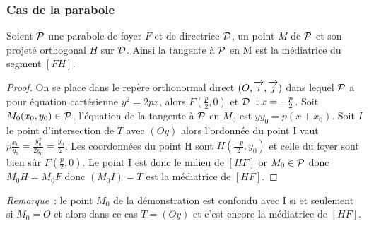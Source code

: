 \subsubsection{Cas de la parabole}
\begin{prop}
  Soient \(\P\) une parabole de foyer \(F\) et de directrice \(\Dr\), un point \(M\) de \(\P\) et son projeté orthogonal \(H\) sur \(\Dr\). Ainsi la tangente à \(\P\) en M est la médiatrice du segment \([FH]\).
\end{prop}
\begin{proof}
  On se place dans le repère orthonormal direct \(\rond\) dans lequel \(\P\) a pour équation cartésienne \(y^2=2px\), alors \(F\left(\frac{p}{2},0\right)\) et \(\Dr{}~: x=-\frac{p}{2}\). Soit \(M_0(x_0,y_0)\in\P\), l'équation de la tangente à \(\P\) en \(M_0\) est \(yy_0=p(x+x_0)\). Soit \(I\) le point d'intersection de \(T\) avec \((Oy)\) alors l'ordonnée du point I vaut \(p\frac{x_0}{y_0}=\frac{y_0^2}{2y_0}=\frac{y_0}{2}\). Les coordonnées du point H sont \(H\left(\frac{-p}{2}, y_0\right)\) et celle du foyer sont bien sûr \(F\left(\frac{p}{2},0\right)\). Le point I est donc le milieu de \([HF]\) or \(M_0\in\P\) donc \(M_0H=M_0F\) donc \((M_0I)=T\) est la médiatrice de \([HF]\).
\end{proof}
\emph{Remarque}~: le point \(M_0\) de la démonstration est confondu avec I si et seulement si \(M_0=O\) et alors dans ce cas \(T=(Oy)\) et c'est encore la médiatrice de \([HF]\).

